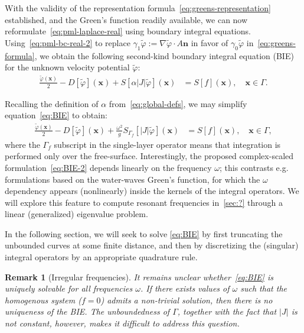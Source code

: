 \documentclass[11pt]{article}
\newcommand{\bn}{\mathbf{n}}
\newcommand{\bx}{\mathbf{x}}
\newcommand{\by}{\mathbf{y}}
\newcommand{\de}{\,\mathrm{d}}
\newcommand{\tvarphi}{\tilde \varphi}
\newtheorem{remark}[theorem]{Remark}
\begin{document}
With the validity of the representation formula~\cref{eq:greens-representation}
established, and the Green's function readily available, we can now
reformulate~\cref{eq:pml-laplace-real} using boundary integral equations.
Using~\cref{eq:pml-bc-real-2} to replace $\gamma_1\tvarphi := \nabla \tvarphi
\cdot A \bn$ in
favor of $\gamma_0 \tvarphi$ in~\cref{eq:greens-formula}, we obtain the
following second-kind boundary integral equation (BIE) for the unknown velocity potential
$\tvarphi$:
\begin{align}
  \label{eq:BIE}
  \frac{\tvarphi(\bx)}{2} - D[\tvarphi](\bx) + S\left[\alpha\left|J\right|\tvarphi\right](\bx) &= S[f](\bx), \quad \bx \in \Gamma.
\end{align}

Recalling the definition of $\alpha$ from~\cref{eq:global-defs}, we may simplify
equation~\cref{eq:BIE} to obtain:
\begin{align}
  \label{eq:BIE-2}
  \frac{\tvarphi(\bx)}{2} - D[\tvarphi](\bx) + \frac{\omega^2}{g}S_{\Gamma_f}\left[\left|J\right|\tvarphi\right](\bx) &= S[f](\bx), \quad \bx \in \Gamma,
\end{align}
where the $\Gamma_f$ subscript in the single-layer operator means that
integration is performed only over the free-surface. Interestingly, the proposed
complex-scaled formulation~\cref{eq:BIE-2} depends linearly on the frequency
$\omega$; this contrasts e.g. formulations based on the water-waves Green's
function, for which the $\omega$ dependency appears (nonlinearly) inside the
kernels of the integral operators. We will explore this feature to compute
resonant frequencies in~\cref{sec:?} through a linear (generalized) eigenvalue
problem.


In the following section, we will seek to solve \cref{eq:BIE} by first
truncating the unbounded curves at some finite distance, and then by
discretizing the (singular) integral operators by an appropriate quadrature
rule. 

\begin{remark}[Irregular frequencies]
  It remains unclear whether~\cref{eq:BIE} is uniquely solvable for all
  frequencies $\omega$. If there exists values of $\omega$ such that the
  homogenous system ($f=0$) admits a non-trivial solution, then there is no
  uniqueness of the BIE. The unboundedness of $\Gamma$, together with the fact
  that $|J|$ is not constant, however, makes it difficult to address this
  question.
\end{remark}
\end{document}
